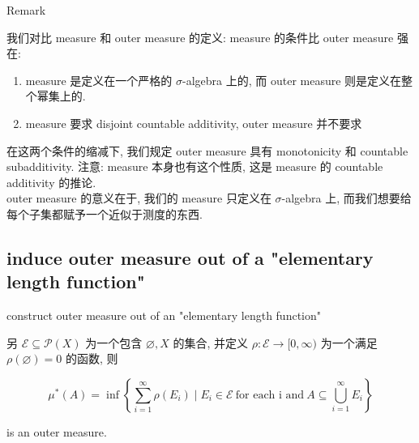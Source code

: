 \documentclass{qlnotes-export}
\begin{document}
\begin{qlremark}{Remark}

我们对比 measure 和 outer measure 的定义: measure 的条件比 outer measure 强在:

\begin{enumerate}
\item
  measure 是定义在一个严格的 \(\sigma\)-algebra 上的, 而 outer measure 则是定义在整个幂集上的.
\item
  measure 要求 disjoint countable additivity, outer measure 并不要求
\end{enumerate}

\end{qlremark}

在这两个条件的缩减下, 我们规定 outer measure 具有 monotonicity 和 countable subadditivity. 注意: measure 本身也有这个性质, 这是 measure 的 countable additivity 的推论.\\
outer measure 的意义在于, 我们的 measure 只定义在 \(\sigma\)-algebra 上, 而我们想要给每个子集都赋予一个近似于测度的东西.

\subsection{induce outer measure out of a "elementary length function"}\label{induce-outer-measure-out-of-a-elementary-length-function}

\begin{theorem}{construct outer measure out of an "elementary length function"}\label{thm-02-outer-measure-completion-of-a-measurable-space-construct-outer-measure-out-of-an-elementary-length-function}

另 \(\mathcal{E} \subseteq \mathcal{P}(X)\) 为一个包含 \(\varnothing,X\) 的集合, 并定义 \(\rho:\mathcal{E}\rightarrow\lbrack 0,\infty)\) 为一个满足 \(\rho(\varnothing) = 0\) 的函数, 则

\[\mu^{\ast}(A) = \inf\left\{ {\sum\limits_{i = 1}^{\infty}\rho(E_{i}) \mid E_{i} \in \mathcal{E}\ \text{for each i and}\ A \subseteq \bigcup\limits_{i = 1}^{\infty}E_{i}} \right\}\]

is an outer measure.

\end{theorem}
\end{document}
